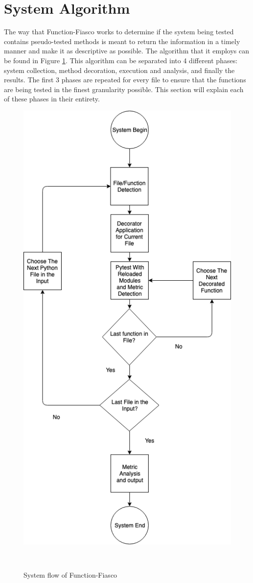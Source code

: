 \section{System Algorithm}
    The way that Function-Fiasco works to determine if the system being tested contains pseudo-tested methods is meant to return the information in a timely manner and make it as descriptive as possible. The algorithm that it employs can be found in Figure \ref{systemFlow}. This algorithm can be separated into 4 different phases: system collection, method decoration, execution and analysis, and finally the results. The first 3 phases are repeated for every file to ensure that the functions are being tested in the finest granularity possible. This section will explain each of these phases in their entirety.

  \begin{figure}[htbp]
    \centering
    \includegraphics[scale = .6]{images/flow.png}
    \caption{System flow of Function-Fiasco}~\label{systemFlow}
  \end{figure}


